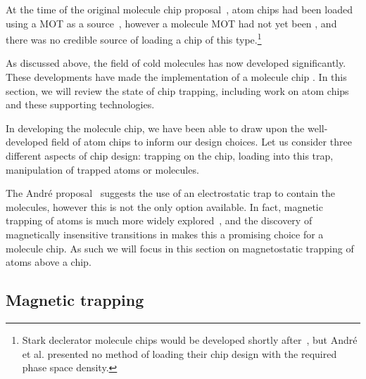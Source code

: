 
At the time of the original molecule chip proposal~\cite{Andre2006}, atom chips
had been loaded using a MOT as a source~\cite{Reichel1999, Ott2001}, however a
molecule MOT had not yet been , and there was no
credible source of loading a chip of this type.\footnote{Stark declerator
molecule chips would be developed shortly after~\cite{Meek2009}, but Andr\'e et
al. presented no method of loading their chip design with the required phase
space density.}  

As discussed above, the field of cold molecules has now developed significantly.
These developments have made the implementation of a molecule chip . In
this section, we will review the state of chip trapping, including work on atom
chips and these supporting technologies.

In developing the molecule chip, we have been able to draw upon the
well-developed field of atom chips to inform our design choices. Let us consider
three different aspects of chip design: trapping on the chip, loading into this
trap, manipulation of trapped atoms or molecules.

The Andr\'e proposal~\cite{Andre2006} suggests the use of an electrostatic trap
to contain the molecules, however this is not the only option available. In
fact, magnetic trapping of atoms is much more widely explored~\cite{2011Ac},
and the discovery of magnetically insensitive transitions in \CaF{} makes this a
promising choice for a molecule chip. As such we will focus in this section on
magnetostatic trapping of atoms above a chip.

\subsection{Magnetic trapping}
\label{chiptraps:magentic}



